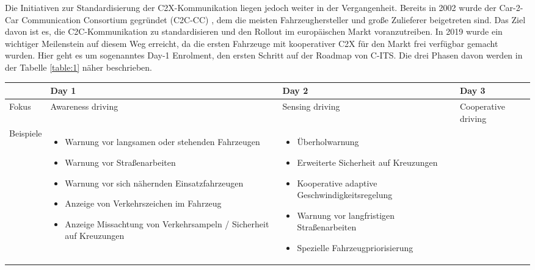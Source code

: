 Die Initiativen zur Standardisierung der C2X-Kommunikation liegen jedoch weiter in der Vergangenheit. Bereits in 2002 wurde der Car-2-Car Communication Consortium gegründet (C2C-CC)  \cite{Car2Car}, dem die meisten Fahrzeughersteller und große Zulieferer beigetreten sind. Das Ziel davon ist es, die C2C-Kommunikation zu standardisieren und den Rollout im europäischen Markt voranzutreiben. In 2019 wurde ein wichtiger Meilenstein auf diesem Weg erreicht, da die ersten Fahrzeuge mit kooperativer C2X für den Markt frei verfügbar gemacht wurden. Hier geht es um sogenanntes Day-1 Enrolment, den ersten Schritt auf der Roadmap von C-ITS. Die drei Phasen davon werden in der Tabelle \ref{table:1} näher beschrieben.

\begin{table}[h!]
	\centering
	\begin{tabular}{|m{4em}|m{10em}|m{10em}|m{8em}|} 
		\hline
		& Day 1 & Day 2 & Day 3 \\ [1ex]
		\hline
		Fokus & Awareness driving & Sensing driving & Cooperative driving \\ [1ex]
		\hline 
		Beispiele & \begin{itemize}[leftmargin=0.3cm] \item Warnung vor langsamen oder stehenden Fahrzeugen
		
		\item Warnung vor Straßenarbeiten
		
		\item Warnung vor sich nähernden Einsatzfahrzeugen
		
		\item Anzeige von Verkehrszeichen im Fahrzeug
		
		\item Anzeige Missachtung von Verkehrsampeln / Sicherheit auf Kreuzungen 
		
	\end{itemize} & 
	\begin{itemize}[leftmargin=0.3cm] \item Überholwarnung
	
	\item Erweiterte Sicherheit auf Kreuzungen 
	
	\item Kooperative adaptive Geschwindigkeitsregelung
	
	\item Warnung vor langfristigen Straßenarbeiten
	
	\item Spezielle Fahrzeugpriorisierung
	

\end{itemize}
\end{tabular}
\end{table}

